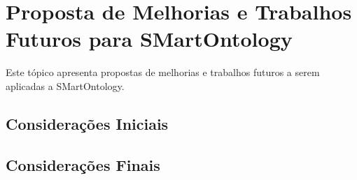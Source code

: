 \chapter{Proposta de Melhorias e Trabalhos Futuros para SMartOntology}
\label{sec:melhorias_trabalhos_futuros}

Este tópico apresenta propostas de melhorias e trabalhos futuros a serem aplicadas a SMartOntology.

\section{Considerações Iniciais}
\label{sec:concidaracoes_iniciais}


\section{Considerações Finais}
\label{sec:concidaracoes_finais}
